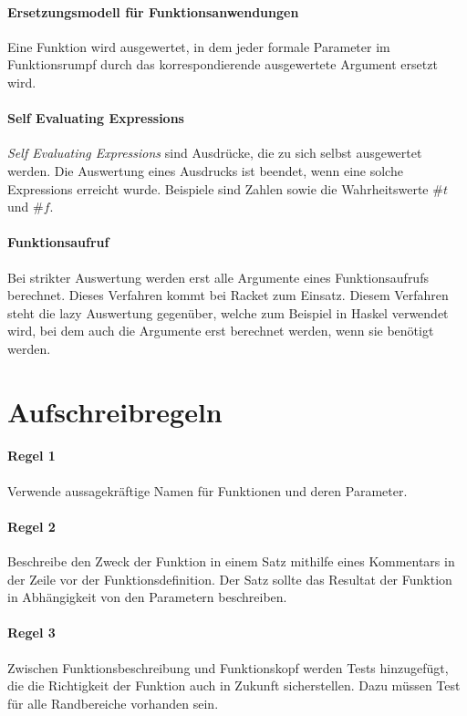 \documentclass[../main.tex]{subfiles}
\begin{document}
        \paragraph{Ersetzungsmodell für Funktionsanwendungen}
    	\label{section:Programmierung:Auswertungsregeln:ErsetzungsmodellFunktionsanwendungen}
    	    Eine Funktion wird ausgewertet, in dem jeder formale Parameter im Funktionsrumpf durch das korrespondierende ausgewertete Argument ersetzt wird.
            
        \paragraph{Self Evaluating Expressions}
            \emph{Self Evaluating Expressions} sind Ausdrücke, die zu sich selbst ausgewertet werden. Die Auswertung eines Ausdrucks ist beendet, wenn eine solche Expressions erreicht wurde. Beispiele sind Zahlen sowie die Wahrheitswerte $\#t$ und $\#f$.
            
        \paragraph{Funktionsaufruf}
            Bei strikter Auswertung werden erst alle Argumente eines Funktionsaufrufs berechnet. Dieses Verfahren kommt bei Racket zum Einsatz. Diesem Verfahren steht die lazy Auswertung gegenüber, welche zum Beispiel in Haskel verwendet wird, bei dem auch die Argumente erst berechnet werden, wenn sie benötigt werden.   
            
    \section{Aufschreibregeln}
        \paragraph{Regel 1}
            Verwende aussagekräftige Namen für Funktionen und deren Parameter.
        
        \paragraph{Regel 2}
            Beschreibe den Zweck der Funktion in einem Satz mithilfe eines Kommentars in der Zeile vor der Funktionsdefinition. Der Satz sollte das Resultat der Funktion in Abhängigkeit von den Parametern beschreiben.
            
        \paragraph{Regel 3}
            Zwischen Funktionsbeschreibung und Funktionskopf werden Tests hinzugefügt, die die Richtigkeit der Funktion auch in Zukunft sicherstellen. Dazu müssen Test für alle Randbereiche vorhanden sein.
            
\end{document}
